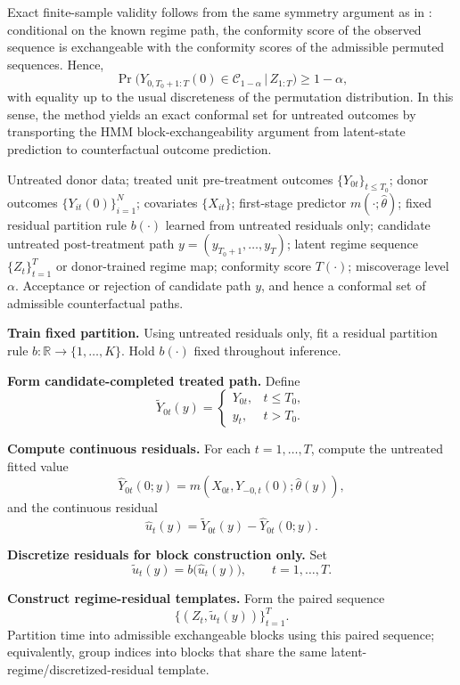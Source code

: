 \documentclass{article}
\begin{document}
Exact finite-sample validity follows from the same symmetry argument as in \citet{Nettasinghe2023}: conditional on the known regime path, the conformity score of the observed sequence is exchangeable with the conformity scores of the admissible permuted sequences. Hence,
\[
\Pr\big( Y_{0,T_0+1:T}(0) \in \mathcal C_{1-\alpha} \,\big|\, Z_{1:T} \big)
\geq 1-\alpha,
\]
with equality up to the usual discreteness of the permutation distribution. In this sense, the method yields an exact conformal set for untreated outcomes by transporting the HMM block-exchangeability argument from latent-state prediction to counterfactual outcome prediction.

\begin{algorithm}[t]
\caption{Latent-Regime Block Conformal Inference via Continuous Residual Scoring}
\label{alg:lrbci}
\begin{algorithmic}[1]
\Require Untreated donor data; treated unit pre-treatment outcomes $\{Y_{0t}\}_{t \le T_0}$; donor outcomes $\{Y_{it}(0)\}_{i=1}^N$; covariates $\{X_{it}\}$; first-stage predictor $m(\cdot;\hat\theta)$; fixed residual partition rule $b(\cdot)$ learned from untreated residuals only; candidate untreated post-treatment path $y=(y_{T_0+1},\dots,y_T)$; latent regime sequence $\{Z_t\}_{t=1}^T$ or donor-trained regime map; conformity score $T(\cdot)$; miscoverage level $\alpha$.
\Ensure Acceptance or rejection of candidate path $y$, and hence a conformal set of admissible counterfactual paths.

\State \textbf{Train fixed partition.}
Using untreated residuals only, fit a residual partition rule $b:\mathbb{R}\to\{1,\dots,K\}$.
Hold $b(\cdot)$ fixed throughout inference.

\State \textbf{Form candidate-completed treated path.}
Define
\[
\tilde Y_{0t}(y)=
\begin{cases}
Y_{0t}, & t\le T_0,\\
y_t, & t>T_0.
\end{cases}
\]

\State \textbf{Compute continuous residuals.}
For each $t=1,\dots,T$, compute the untreated fitted value
\[
\hat Y_{0t}(0;y)=m(X_{0t},Y_{-0,t}(0);\hat\theta(y)),
\]
and the continuous residual
\[
\hat u_t(y)=\tilde Y_{0t}(y)-\hat Y_{0t}(0;y).
\]

\State \textbf{Discretize residuals for block construction only.}
Set
\[
\tilde u_t(y)=b\big(\hat u_t(y)\big), \qquad t=1,\dots,T.
\]

\State \textbf{Construct regime-residual templates.}
Form the paired sequence
\[
\bigl\{(Z_t,\tilde u_t(y))\bigr\}_{t=1}^T.
\]
Partition time into admissible exchangeable blocks using this paired sequence; equivalently, group indices into blocks that share the same latent-regime/discretized-residual template.


\end{algorithmic}
\end{algorithm}
\end{document}
